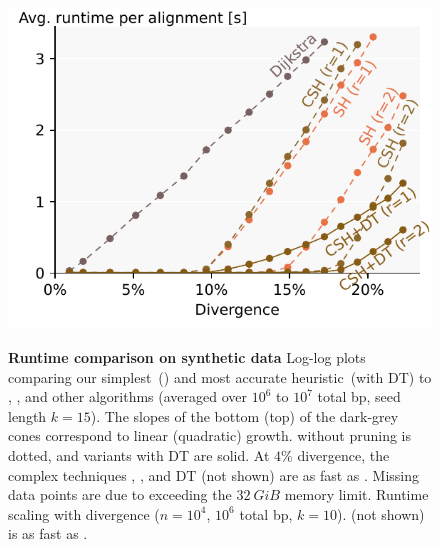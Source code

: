 \begin{figure}[H]
    {\includegraphics[scale=0.55]{plots/scaling_e.labels.pdf}\label{fig:scaling-e}}
    \hfill
    \caption[Runtime scaling on synthetic data]{
      \textbf{Runtime comparison on synthetic data}
      \protect{}\protect{}
  Log-log plots comparing our simplest~(\SH) and most accurate
  heuristic~(\GCH with DT) to \edlib, \wfa, and other algorithms
      (averaged over $10^6$ to $10^7$ total bp, seed length $k{=}15$).
  The slopes of the bottom (top) of the dark-grey cones correspond to linear (quadratic) growth.
      \SH without
      pruning is dotted, and variants with DT are solid. At $4\%$ divergence,
      the complex techniques \CSH, \GCH, and DT (not shown) are as fast as \SH.
  Missing data points are due to exceeding the $\qty{32}{GiB}$ memory limit.
  \protect{}
  Runtime scaling with divergence ($n{=}10^4$, $10^6$ total bp, $k{=}10$).
      \GCH (not shown) is as fast as \CSH.}
    \label{fig:synthetic}
\end{figure}
